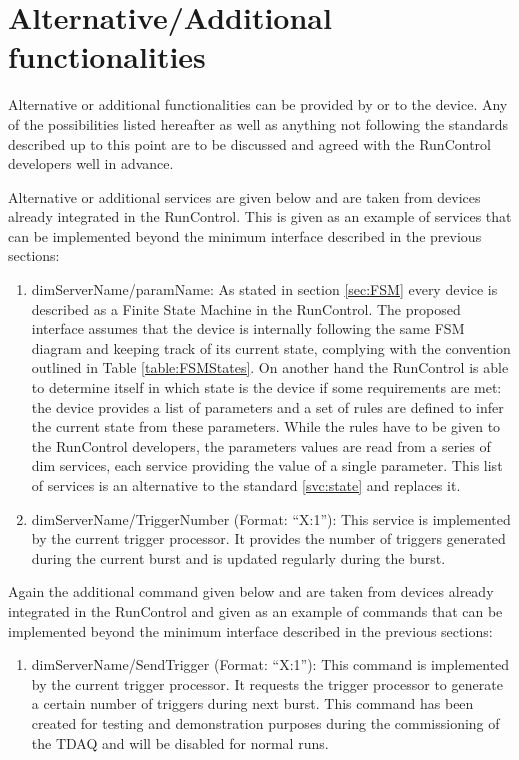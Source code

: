 \documentclass[a4paper]{article}
\begin{document}
\section{Alternative/Additional functionalities}
Alternative or additional functionalities can be provided by or to the device. Any of the
possibilities listed hereafter as well as anything not following the standards described
up to this point are to be discussed and agreed with the RunControl developers well in advance.

Alternative or additional services are given below and are taken from devices
already integrated in the RunControl. This is given as an example of services
that can be implemented beyond the minimum interface described in the previous
sections:
\begin{enumerate}[label=\textbf{ASVC.\arabic*}]
	\item \label{svc:stateParams} dimServerName/paramName: As stated in section
	\ref{sec:FSM} every device is described as a Finite State Machine in the
	RunControl. The proposed interface assumes that the device is internally
	following the same FSM diagram and keeping track of its current state,
	complying with the convention outlined in Table \ref{table:FSMStates}. On
	another hand the RunControl is able to determine itself in which state is the
	device if some requirements are met: the device provides a list of parameters
	and a set of rules are defined to infer the current state from these
	parameters.
	While the rules have to be given to the RunControl developers, the parameters
	values are read from a series of dim services, each service providing the
	value of a single parameter. This list of services is an alternative to the
	standard \ref{svc:state} and replaces it.
	\item dimServerName/TriggerNumber (Format: ``X:1''): This service is
	implemented by the current trigger processor. It provides the number of
	triggers generated during the current burst and is updated regularly during
	the burst.
\end{enumerate}

Again the additional command given below and are taken from devices already
integrated in the RunControl and given as an example of commands that can be
implemented beyond the minimum interface described in the previous sections:
\begin{enumerate}[label=\textbf{ACMD.\arabic*}]
	\item dimServerName/SendTrigger (Format: ``X:1''): This command is implemented
	by the current trigger processor. It requests the trigger processor to
	generate a certain number of triggers during next burst. This command has been
	created for testing and demonstration purposes during the commissioning of the
	TDAQ and will be disabled for normal runs.
\end{enumerate}
\end{document}
